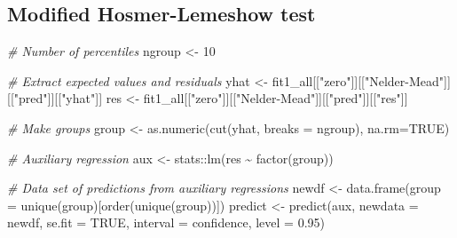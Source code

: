 \documentclass[
]{article}
\newenvironment{Shaded}{\begin{snugshade}}{\end{snugshade}}
\newcommand{\AttributeTok}[1]{\textcolor[rgb]{0.77,0.63,0.00}{#1}}
\newcommand{\CommentTok}[1]{\textcolor[rgb]{0.56,0.35,0.01}{\textit{#1}}}
\newcommand{\ConstantTok}[1]{\textcolor[rgb]{0.00,0.00,0.00}{#1}}
\newcommand{\DecValTok}[1]{\textcolor[rgb]{0.00,0.00,0.81}{#1}}
\newcommand{\FloatTok}[1]{\textcolor[rgb]{0.00,0.00,0.81}{#1}}
\newcommand{\FunctionTok}[1]{\textcolor[rgb]{0.00,0.00,0.00}{#1}}
\newcommand{\NormalTok}[1]{#1}
\newcommand{\OtherTok}[1]{\textcolor[rgb]{0.56,0.35,0.01}{#1}}
\newcommand{\SpecialCharTok}[1]{\textcolor[rgb]{0.00,0.00,0.00}{#1}}
\newcommand{\StringTok}[1]{\textcolor[rgb]{0.31,0.60,0.02}{#1}}
\begin{document}
\newpage

\hypertarget{modified-hosmer-lemeshow-test}{%
\subsection{Modified Hosmer-Lemeshow test}\label{modified-hosmer-lemeshow-test}}

\begin{Shaded}
\begin{Highlighting}[]
\CommentTok{\# Number of percentiles  }
\NormalTok{ngroup }\OtherTok{\textless{}{-}} \DecValTok{10}

\CommentTok{\# Extract expected values and residuals}
\NormalTok{yhat }\OtherTok{\textless{}{-}}\NormalTok{ fit1\_all[[}\StringTok{"zero"}\NormalTok{]][[}\StringTok{"Nelder{-}Mead"}\NormalTok{]][[}\StringTok{"pred"}\NormalTok{]][[}\StringTok{"yhat"}\NormalTok{]]}
\NormalTok{res }\OtherTok{\textless{}{-}}\NormalTok{ fit1\_all[[}\StringTok{"zero"}\NormalTok{]][[}\StringTok{"Nelder{-}Mead"}\NormalTok{]][[}\StringTok{"pred"}\NormalTok{]][[}\StringTok{"res"}\NormalTok{]]}

\CommentTok{\# Make groups}
\NormalTok{group }\OtherTok{\textless{}{-}} \FunctionTok{as.numeric}\NormalTok{(}\FunctionTok{cut}\NormalTok{(yhat, }\AttributeTok{breaks =}\NormalTok{ ngroup), }\AttributeTok{na.rm=}\ConstantTok{TRUE}\NormalTok{)}

\CommentTok{\# Auxiliary regression}
\NormalTok{aux }\OtherTok{\textless{}{-}}\NormalTok{ stats}\SpecialCharTok{::}\FunctionTok{lm}\NormalTok{(res }\SpecialCharTok{\textasciitilde{}} \FunctionTok{factor}\NormalTok{(group))}

\CommentTok{\# Data set of predictions from auxiliary regressions}
\NormalTok{newdf }\OtherTok{\textless{}{-}} \FunctionTok{data.frame}\NormalTok{(}\AttributeTok{group =} \FunctionTok{unique}\NormalTok{(group)[}\FunctionTok{order}\NormalTok{(}\FunctionTok{unique}\NormalTok{(group))])}
\NormalTok{predict }\OtherTok{\textless{}{-}} \FunctionTok{predict}\NormalTok{(aux, }
                   \AttributeTok{newdata =}\NormalTok{ newdf, }
                   \AttributeTok{se.fit =} \ConstantTok{TRUE}\NormalTok{, }
                   \AttributeTok{interval =} \StringTok{\textquotesingle{}confidence\textquotesingle{}}\NormalTok{, }
                   \AttributeTok{level =} \FloatTok{0.95}\NormalTok{)}


\end{Highlighting}
\end{Shaded}
\end{document}
